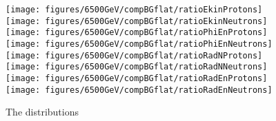 \begin{figure}
\begin{center}
  \texttt{[image: figures/6500GeV/compBGflat/ratioEkinProtons]}
  \texttt{[image: figures/6500GeV/compBGflat/ratioEkinNeutrons]}
  \texttt{[image: figures/6500GeV/compBGflat/ratioPhiEnProtons]}
  \texttt{[image: figures/6500GeV/compBGflat/ratioPhiEnNeutrons]}
  \texttt{[image: figures/6500GeV/compBGflat/ratioRadNProtons]}
  \texttt{[image: figures/6500GeV/compBGflat/ratioRadNNeutrons]}
  \texttt{[image: figures/6500GeV/compBGflat/ratioRadEnProtons]}
  \texttt{[image: figures/6500GeV/compBGflat/ratioRadEnNeutrons]}
\end{center}
\vspace{-0.6cm}
 \caption{The distributions 
  \label{fig:ProtNeut6p52}} 
\end{figure}

\clearpage

